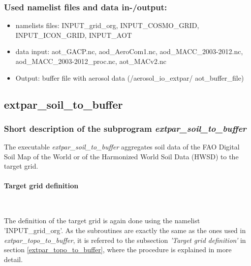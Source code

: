 \documentclass[a4paper,10pt,DIV14,BCOR1cm,titlepage,twoside]{scrartcl}
\begin{document}
\subsubsection{Used namelist files and data in-/output:}
\begin{itemize}
\item namelists files: INPUT\_grid\_org, INPUT\_COSMO\_GRID, INPUT\_ICON\_GRID, INPUT\_AOT
 \item data input: aot\_GACP.nc, aod\_AeroCom1.nc, aod\_MACC\_2003-2012.nc, \\
     aod\_MACC\_2003-2012\_proc.nc, aot\_MACv2.nc
 \item Output: buffer file with aerosol data (/aerosol\_io\_extpar/ aot\_buffer\_file)
\end{itemize}



\subsection{extpar\_soil\_to\_buffer}\label{extpar_soil_to_buffer}
\subsubsection{Short description of the subprogram \textit{extpar\_soil\_to\_buffer}}
The executable \textit{extpar\_soil\_to\_buffer} aggregates soil data of the FAO Digital Soil Map of the World or of the Harmonized World Soil Data (HWSD) to the target grid.\par\medskip\noindent
\paragraph{Target grid definition} \ \par\medskip\noindent
The definition of the target grid is again done using the namelist 'INPUT\_grid\_org'. As the subroutines are exactly the same as the ones used in \textit{extpar\_topo\_to\_buffer}, it is referred to the subsection \textit{'Target grid definition'} in section \ref{extpar_topo_to_buffer}, where the procedure is explained in more detail. \par\medskip\noindent
\end{document}
